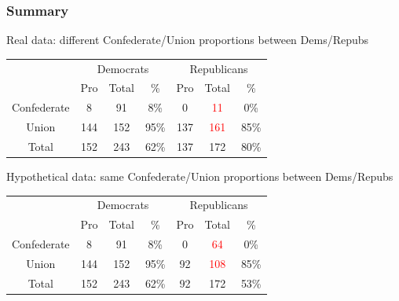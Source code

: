 \documentclass[slides]{beamer}\usepackage[]{graphicx}\usepackage[]{color}
\newcommand{\blue}[1]{\textcolor{blue2}{#1}}
\begin{document}
\begin{frame}
\frametitle{Summary}

\blue{Real data}: different Confederate/Union proportions between Dems/Repubs
\begin{center}
	\begin{tabular}{c|ccc|ccc}
     & \multicolumn{3}{c|}{Democrats}  & \multicolumn{3}{c}{Republicans} \\ 
     & Pro & Total & \% & Pro & Total & \% \\ 
     \hline
     Confederate & 8 & 91 & \blue{8\%} & 0 & \textcolor{red}{11} & 0\% \\ 
	 Union & 144 & 152 & \blue{95\%} & 137 & \textcolor{red}{161} & 85\% \\ 
    \hline
     Total & 152 & 243 & 62\% & 137 & 172 & \blue{80\%} \\ 
  \end{tabular}
\end{center}
\pause
\blue{Hypothetical data}: same Confederate/Union proportions between Dems/Repubs
\begin{center}
	\begin{tabular}{c|ccc|ccc}
     & \multicolumn{3}{c|}{Democrats}  & \multicolumn{3}{c}{Republicans} \\ 
     & Pro & Total & \% & Pro & Total & \% \\ 
     \hline
     Confederate & 8 & 91 & \blue{8\%} & 0 & \textcolor{red}{64} & 0\% \\ 
	 Union & 144 & 152 & \blue{95\%} & 92 & \textcolor{red}{108} & 85\% \\ 
    \hline
     Total & 152 & 243 & \blue{62\%} & 92 & 172 & 53\% \\      
  \end{tabular}
\end{center}

\end{frame}
\end{document}
